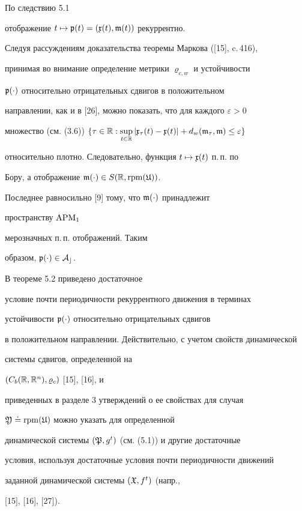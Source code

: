 \begin{pf}


По следствию 5.1


отображение $t\mapsto\frak p(t)=(\frak x(t),\frak m(t))$ рекуррентно. 


Следуя рассуждениям доказательства теоремы Маркова ([15], c.\,416),


принимая во внимание определение метрики $\varrho_{c,w}$ и устойчивости


$\frak p(\cdot)$ относительно отрицательных сдвигов в положительном


направлении, как и в [26], можно показать, что для каждого $\varepsilon>0$


множество (см. (3.6)) $\{\tau\in\Bbb R:\sup\limits_{t\in\Bbb R}


|\frak x_\tau(t)-\frak x(t)|+


d_w(\frak m_\tau,\frak m)\le\varepsilon\}$


относительно плотно. Следовательно, функция $t\mapsto\frak x(t)$ п.\,п. по


Бору, а отображение $\frak m(\cdot)\in S(\Bbb R,\operatorname{rpm}(\frak U))$.


Последнее равносильно [9] тому, что $\frak m(\cdot)$ принадлежит


пространству $\operatorname{APM}_1$   %


мерозначных п.\,п. отображений. Таким


образом, $\frak p(\cdot)\in\cal A_c$.


\end{pf}








\begin{notes}


В теореме 5.2 приведено достаточное


условие почти периодичности рекуррентного движения в терминах


устойчивости $\frak p(\cdot)$ относительно отрицательных сдвигов


в положительном направлении. Действительно, с учетом свойств динамической


системы сдвигов, определенной на


$(C_b(\Bbb R,\Bbb R^n),\varrho_c)$ [15], [16], и


приведенных в разделе 3 утверждений о ее свойствах для случая


$\frak Y\doteq\operatorname{rpm}(\frak U)$ можно указать для определенной


динамической системы $(\frak P,g^t)$ (см. (5.1)) и другие достаточные


условия, используя достаточные условия почти периодичности движений


заданной динамической системы $({\frak X},f^t)$ (напр., 


[15], [16], [27]).


\end{notes}





